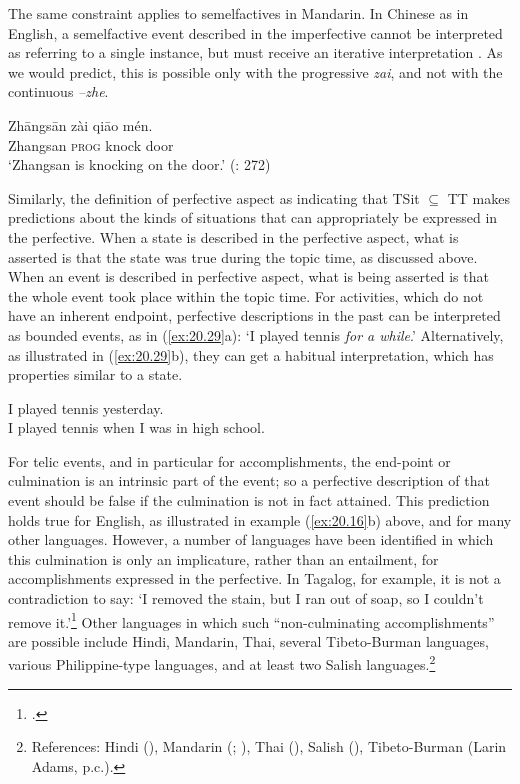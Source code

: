 The same constraint applies to semelfactives in Mandarin. In Chinese as in English, a semelfactive event described in the imperfective cannot be interpreted as referring to a single instance, but must receive an iterative interpretation . As we would predict, this is possible only with the progressive \textit{zai}, and not with the continuous \textit{–zhe}.


\ea \label{ex:20.28}
\gll Zhāngsān  zài  qiāo  mén.\\
Zhangsan  \textsc{prog}  knock  door\\
\glt ‘Zhangsan is knocking on the door.’  (\citealt{Smith1997}: 272)
\z


Similarly, the definition of perfective aspect as indicating that TSit ${\subseteq}$ TT makes predictions about the kinds of situations that can appropriately be expressed in the perfective. When a state is described in the perfective aspect, what is asserted is that the state was true during the topic time, as discussed above. When an event is described in perfective aspect, what is being asserted is that the whole event took place within the topic time. For activities, which do not have an inherent endpoint, perfective descriptions in the past can be interpreted as bounded events, as in (\ref{ex:20.29}a): ‘I played tennis \textit{for a while}.’ Alternatively, as illustrated in (\ref{ex:20.29}b), they can get a habitual interpretation, which has properties similar to a state.


\ea \label{ex:20.29}
\ea  I played tennis yesterday.\\
\ex I played tennis when I was in high school.
                       \z
\z


For telic events, and in particular for accomplishments, the end-point or culmination is an intrinsic part of the event; so a perfective description of that event should be false if the culmination is not in fact attained. This prediction holds true for English, as illustrated in example (\ref{ex:20.16}b) above, and for many other languages. However, a number of languages have been identified in which this culmination is only an implicature, rather than an entailment, for accomplishments expressed in the perfective. In Tagalog, for example, it is not a contradiction to say: ‘I removed the stain, but I ran out of soap, so I couldn’t remove it.’\footnote{\citet[186]{Dell1983}.} Other languages in which such “non-culminating accomplishments” are possible include Hindi, Mandarin, Thai, several Tibeto-Burman languages, various Philippine-type languages, and at least two Salish languages.\footnote{References: Hindi (\citealt{Singh1991,Singh1998}), Mandarin (\citealt{SohKuo2005}; \citealt{KoenigChief2008}), Thai (\citealt{KoenigMuansuwan2000}), Salish (\citealt{Bar-elEtAl2005}), Tibeto-Burman (Larin Adams, p.c.).}



